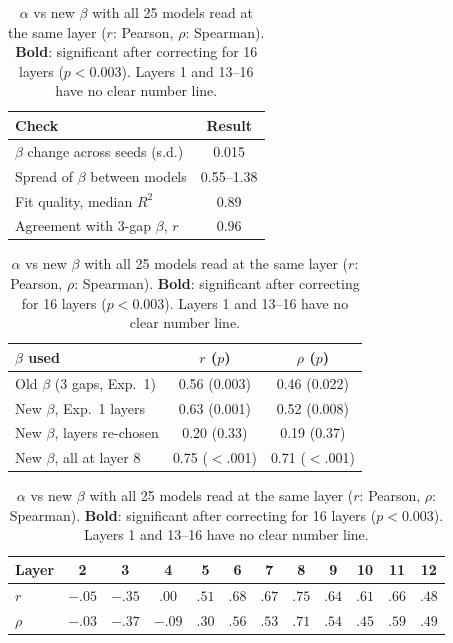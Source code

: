 \begin{table}[!h]
\centering\small\setlength{\tabcolsep}{4pt}
\begin{minipage}[t]{0.42\linewidth}
\centering
\begin{tabular}{lc}
\hline
Check & Result \\
\hline
$\beta$ change across seeds (s.d.) & 0.015 \\
Spread of $\beta$ between models & 0.55--1.38 \\
Fit quality, median $R^2$ & 0.89 \\
Agreement with 3-gap $\beta$, $r$ & 0.96 \\
\hline
\end{tabular}
\caption{Reliability of the new $\beta$.}
\label{tab:exp2a}
\end{minipage}\hfill
\begin{minipage}[t]{0.55\linewidth}
\centering
\begin{tabular}{lcc}
\hline
$\beta$ used & $r$ ($p$) & $\rho$ ($p$) \\
\hline
Old $\beta$ (3 gaps, Exp.~1) & 0.56 (0.003) & 0.46 (0.022) \\
New $\beta$, Exp.~1 layers & 0.63 (0.001) & 0.52 (0.008) \\
New $\beta$, layers re-chosen & 0.20 (0.33) & 0.19 (0.37) \\
New $\beta$, all at layer 8 & 0.75 ($<$.001) & 0.71 ($<$.001) \\
\hline
\end{tabular}
\caption{$\alpha$ vs $\beta$ before and after changing $\beta$.}
\label{tab:exp2b}
\end{minipage}

\vspace{0.8em}
\begin{tabular}{lccccccccccc}
\hline
Layer & 2 & 3 & 4 & 5 & 6 & 7 & 8 & 9 & 10 & 11 & 12 \\
\hline
$r$ & $-.05$ & $-.35$ & $.00$ & $.51$ & $\mathbf{.68}$ & $\mathbf{.67}$ & $\mathbf{.75}$ & $\mathbf{.64}$ & $\mathbf{.61}$ & $\mathbf{.66}$ & $.48$ \\
$\rho$ & $-.03$ & $-.37$ & $-.09$ & $.30$ & $.56$ & $.53$ & $\mathbf{.71}$ & $.54$ & $.45$ & $\mathbf{.59}$ & $.49$ \\
\hline
\end{tabular}
\caption{$\alpha$ vs new $\beta$ with all 25 models read at the same layer ($r$: Pearson, $\rho$:
Spearman). \textbf{Bold}: significant after correcting for 16 layers ($p<0.003$). Layers 1 and
13--16 have no clear number line.}
\label{tab:exp2c}
\end{table}

